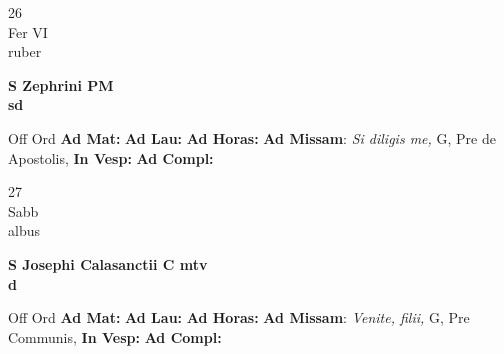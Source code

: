 \documentclass[10pt, openany]{book}
\begin{document}
        \begin{center}
            \begin{minipage}{3.5in}
                \vspace{2em}
                \begin{minipage}{0.5in}
                    {\Huge 26} \\
                    {\normalsize Fer VI} \\
                    {\normalsize ruber}
                \end{minipage}
                \begin{minipage}{3.0in}
                    \textbf{ \large S Zephrini PM \\
                    \textnormal{\normalsize sd}} \\ 
                \end{minipage}
                \begin{justify}Off Ord
                    \textbf{Ad Mat: }
                    \textbf{Ad Lau: }
                    \textbf{Ad Horas: }\textbf{Ad Missam}: \textit{Si diligis me,} G, Pre de Apostolis,  
                    \textbf{In Vesp: }
                    \textbf{Ad Compl: }
                \end{justify}
            \end{minipage}
        \end{center}
    
        \begin{center}
            \begin{minipage}{3.5in}
                \vspace{2em}
                \begin{minipage}{0.5in}
                    {\Huge 27} \\
                    {\normalsize Sabb} \\
                    {\normalsize albus}
                \end{minipage}
                \begin{minipage}{3.0in}
                    \textbf{ \large S Josephi Calasanctii C mtv \\
                    \textnormal{\normalsize d}} \\ 
                \end{minipage}
                \begin{justify}Off Ord
                    \textbf{Ad Mat: }
                    \textbf{Ad Lau: }
                    \textbf{Ad Horas: }\textbf{Ad Missam}: \textit{Venite, filii,} G, Pre Communis,  
                    \textbf{In Vesp: }
                    \textbf{Ad Compl: }
                \end{justify}
            \end{minipage}
        \end{center}
    
\end{document}

